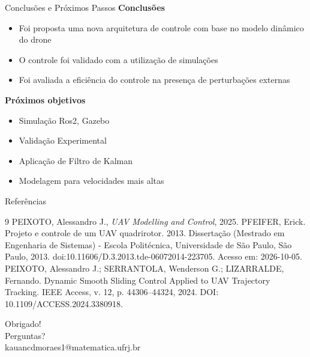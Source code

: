 \documentclass[aspectratio=169, 11pt]{beamer}
\begin{document}
  \begin{frame}{Conclusões e Próximos Passos}
    \textbf{Conclusões}
    \begin{itemize}
      \item Foi proposta uma nova arquitetura de controle com base no modelo dinâmico do drone
      \item O controle foi validado com a utilização de simulações
      \item Foi avaliada a eficiência do controle na presença de perturbações externas
    \end{itemize}
    \textbf{Próximos objetivos}
    \begin{itemize}
      \item Simulação Ros2, Gazebo     
      \item Validação Experimental     
      \item Aplicação de Filtro de Kalman     
      \item Modelagem para velocidades mais altas
    \end{itemize}
  \end{frame}

  \begin{frame}{Referências}
    \begin{thebibliography}{9}
        PEIXOTO, Alessandro J.,
        \emph{UAV Modelling and Control}, 2025.
      PFEIFER, Erick. Projeto e controle de um UAV quadrirotor. 2013. Dissertação (Mestrado em Engenharia de Sistemas) - Escola Politécnica, Universidade de São Paulo, São Paulo, 2013. doi:10.11606/D.3.2013.tde-06072014-223705. Acesso em: 2026-10-05.
      PEIXOTO, Alessandro J.; SERRANTOLA, Wenderson G.; LIZARRALDE, Fernando. Dynamic Smooth Sliding Control Applied to UAV Trajectory Tracking. IEEE Access, v. 12, p. 44306–44324, 2024. DOI: 10.1109/ACCESS.2024.3380918.

    \end{thebibliography}
    \end{frame} 
  
  \begin{frame}
    \vspace{1cm}
    \centering
      \Huge Obrigado!\\[0.5cm]
      \large Perguntas?\\
    \vspace{3cm}  
    \hspace{6.5cm}
    kauancdmoraes1@matematica.ufrj.br
    \end{frame}
\end{document}
